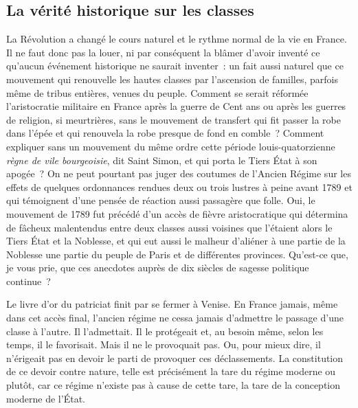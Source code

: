 \documentclass[french,twoside]{book} %
\newcommand{\astermono}{\medskip\centerline{\color{rubric}\large\selectfont{\syms ✻}}\medskip\par}%
\begin{document}
\astermono

\subsection[{La vérité historique sur les classes}]{La vérité historique sur les classes}
\noindent La Révolution a changé le cours naturel et le rythme normal de la vie en France. Il ne faut donc pas la louer, ni par conséquent la blâmer d’avoir inventé ce qu’aucun événement historique ne saurait inventer : un fait aussi naturel que ce mouvement qui renouvelle les hautes classes par l’ascension de familles, parfois même de tribus entières, venues du peuple. Comment se serait réformée l’aristocratie militaire en France après la guerre de Cent ans ou après les guerres de religion, si meurtrières, sans le mouvement de transfert qui fit passer la robe dans l’épée et qui renouvela la robe presque de fond en comble ? Comment expliquer sans un mouvement du même ordre cette période louis-quatorzienne \emph{règne de vile bourgeoisie}, dit Saint Simon, et qui porta le Tiers État à son apogée ? On ne peut pourtant pas juger des coutumes de l’Ancien Régime sur les effets de quelques ordonnances rendues deux ou trois lustres à peine avant 1789 et qui témoignent d’une pensée de réaction aussi passagère que folle. Oui, le mouvement de 1789 fut précédé d’un accès de fièvre aristocratique qui détermina de fâcheux malentendus entre deux classes aussi voisines que l’étaient alors le Tiers État et la Noblesse, et qui eut aussi le malheur d’aliéner à une partie de la Noblesse une partie du peuple de Paris et de différentes provinces. Qu’est-ce que, je vous prie, que ces anecdotes auprès de dix siècles de sagesse politique continue ?\par

\astermono

\noindent Le livre d’or du patriciat finit par se fermer à Venise. En France jamais, même dans cet accès final, l’ancien régime ne cessa jamais d’admettre le passage d’une classe à l’autre. Il l’admettait. Il le protégeait et, au besoin même, selon les temps, il le favorisait. Mais il ne le provoquait pas. Ou, pour mieux dire, il n’érigeait pas en devoir le parti de provoquer ces déclassements. La constitution de ce devoir contre nature, telle est précisément la tare du régime moderne ou plutôt, car ce régime n’existe pas à cause de cette tare, la tare de la conception moderne de l’État.\par

\astermono
\end{document}
